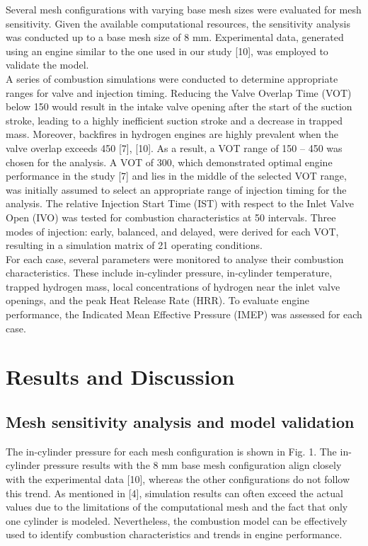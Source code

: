 \documentclass[conference]{IEEEtran}
\begin{document}
Several mesh configurations with varying base mesh sizes were evaluated for mesh sensitivity. Given the available computational resources, the sensitivity analysis was conducted up to a base mesh size of 8 mm. Experimental data, generated using an engine similar to the one used in our study [10], was employed to validate the model.\\

A series of combustion simulations were conducted to determine appropriate ranges for valve and injection timing. Reducing the Valve Overlap Time (VOT) below 150 would result in the intake valve opening after the start of the suction stroke, leading to a highly inefficient suction stroke and a decrease in trapped mass. Moreover, backfires in hydrogen engines are highly prevalent when the valve overlap exceeds 450 [7], [10]. As a result, a VOT range of 150 – 450 was chosen for the analysis. A VOT of 300, which demonstrated optimal engine performance in the study [7] and lies in the middle of the selected VOT range, was initially assumed to select an appropriate range of injection timing for the analysis. The relative Injection Start Time (IST) with respect to the Inlet Valve Open (IVO) was tested for combustion characteristics at 50 intervals. Three modes of injection: early, balanced, and delayed, were derived for each VOT, resulting in a simulation matrix of 21 operating conditions.\\

For each case, several parameters were monitored to analyse their combustion characteristics. These include in-cylinder pressure, in-cylinder temperature, trapped hydrogen mass, local concentrations of hydrogen near the inlet valve openings, and the peak Heat Release Rate (HRR). To evaluate engine performance, the Indicated Mean Effective Pressure (IMEP) was assessed for each case.


\section{Results and Discussion}
\subsection{Mesh sensitivity analysis and model validation}
The in-cylinder pressure for each mesh configuration is shown in Fig. 1. The in-cylinder pressure results with the 8 mm base mesh configuration align closely with the experimental data [10], whereas the other configurations do not follow this trend. As mentioned in [4], simulation results can often exceed the actual values due to the limitations of the computational mesh and the fact that only one cylinder is modeled. Nevertheless, the combustion model can be effectively used to identify combustion characteristics and trends in engine performance.
\end{document}
